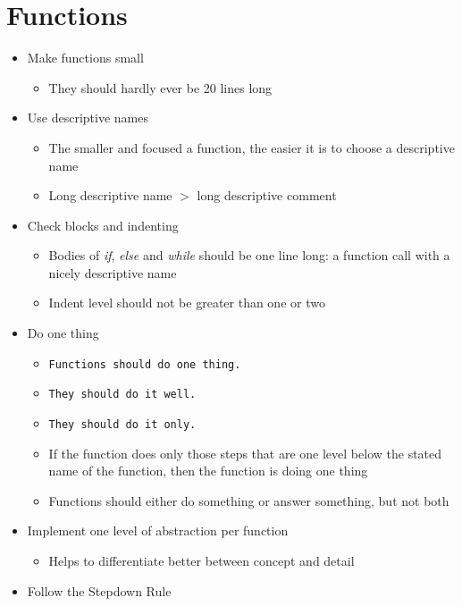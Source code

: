 \section{Functions}
\begin{itemize}
    \item Make functions small
    \begin{itemize}
        \item They should hardly ever be 20 lines long
    \end{itemize}
    \item Use descriptive names
    \begin{itemize}
        \item The smaller and focused a function, the easier it is to choose a descriptive name
        \item Long descriptive name $>$ long descriptive comment
    \end{itemize}
    \item Check blocks and indenting
    \begin{itemize}
        \item Bodies of \textit{if}, \textit{else} and \textit{while} should be one line long:
        a function call with a nicely descriptive name
        \item Indent level should not be greater than one or two
    \end{itemize}
    \item Do one thing
    \begin{itemize}
        \item \texttt{Functions should do one thing.}
        \item [] \texttt{They should do it well.}
        \item [] \texttt{They should do it only.}
        \item If the function does only those steps that are one level below the stated name of the function,
        then the function is doing one thing
        \item Functions should either do something or answer something, but not both
    \end{itemize}
    \item Implement one level of abstraction per function
    \begin{itemize}
        \item Helps to differentiate better between concept and detail
    \end{itemize}
    \item Follow the Stepdown Rule

\end{itemize}
